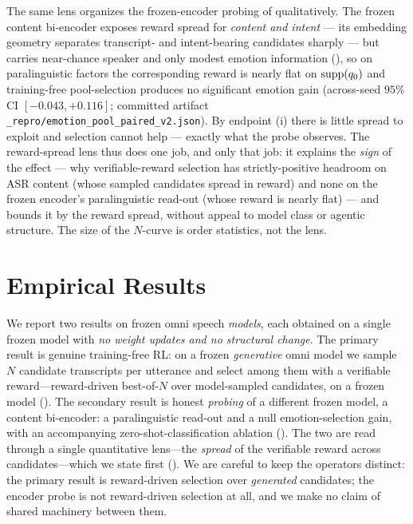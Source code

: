The same lens organizes the frozen-encoder probing of  qualitatively. The frozen content
bi-encoder exposes reward spread for \emph{content and intent} --- its embedding geometry separates
transcript- and intent-bearing candidates sharply --- but carries near-chance speaker and only modest
emotion information (), so on paralinguistic factors the corresponding reward is nearly
flat on $\mathrm{supp}(q_{0})$ and training-free pool-selection produces no significant emotion gain
(across-seed $95\%$ CI $[-0.043,+0.116]$; committed artifact
\texttt{\_repro/emotion\_pool\_paired\_v2.json}). By endpoint (i) there is little spread to exploit and
selection cannot help --- exactly what the probe observes. The reward-spread lens thus does one job, and
only that job: it explains the \emph{sign} of the effect --- why verifiable-reward selection has
strictly-positive headroom on ASR content (whose sampled candidates spread in reward) and none on the
frozen encoder's paralinguistic read-out (whose reward is nearly flat) --- and bounds it by the reward
spread, without appeal to model class or agentic structure. The size of the $N$-curve is order statistics,
not the lens.

\section{Empirical Results}
\label{sec:feasibility}

We report two results on frozen omni speech \emph{models}, each obtained on a single frozen model with \emph{no weight updates and no structural change}. The primary result is genuine training-free RL: on a frozen \emph{generative} omni model we sample $N$ candidate transcripts per utterance and select among them with a verifiable reward---reward-driven best-of-$N$ over model-sampled candidates, on a frozen model (). The secondary result is honest \emph{probing} of a different frozen model, a content bi-encoder: a paralinguistic read-out and a null emotion-selection gain, with an accompanying zero-shot-classification ablation (). The two are read through a single quantitative lens---the \emph{spread} of the verifiable reward across candidates---which we state first (). We are careful to keep the operators distinct: the primary result is reward-driven selection over \emph{generated} candidates; the encoder probe is not reward-driven selection at all, and we make no claim of shared machinery between them.

